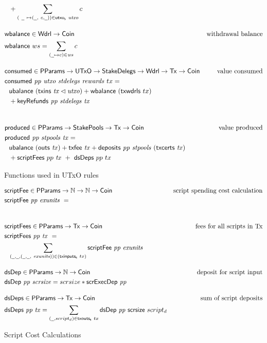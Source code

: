 \begin{figure}[htb]
\begin{align*}
    &~~ + \sum_{(~\wcard ~ \mapsto (\wcard, ~c,\wcard)) \in \fun{utxo_s}~\var{utxo}} c
    \nextdef
    & \fun{wbalance} \in \Wdrl \to \Coin
    & \text{withdrawal balance} \\
    & \fun{wbalance} ~ ws = \sum_{(\wcard\mapsto c)\in\var{ws}} c
    \nextdef
    & \fun{consumed} \in \PParams \to \UTxO \to \StakeDelegs \to \Wdrl \to \Tx \to \Coin
    & \text{value consumed} \\
    & \consumed{pp}{utxo}{stdelegs}{rewards}~{tx} = \\
    & ~~\ubalance{(\txins{tx} \restrictdom \var{utxo})} +
        \fun{wbalance}~(\fun{txwdrls}~{tx}) \\
    & ~~ + \keyRefunds{pp}{stdelegs}{tx} \\
    \nextdef
    & \fun{produced} \in \PParams \to \StakePools \to \Tx \to \Coin
    & \text{value produced} \\
    & \fun{produced}~\var{pp}~\var{stpools}~\var{tx} = \\
    &~~\ubalance{(\outs{tx})}
    + \txfee{tx} + \deposits{pp}{stpools}~{(\txcerts{tx})}\\
    &~~+ \fun{scriptFees}~{pp}~\var{tx}~+~ \fun{dsDeps}~{pp}~tx
  \end{align*}
  \caption{Functions used in UTxO rules}
  \label{fig:functions:utxo}
\end{figure}

\clearpage

\begin{figure}[htb]
  \begin{align*}
    & \fun{scriptFee} \in \PParams \to \N \to \N \to \Coin
    & \text{script spending cost calculation} \\
    & \fun{scriptFee} ~\var{pp}~ \var{exunits} ~=~ \\
    \nextdef
    & \fun{scriptFees} \in \PParams \to \Tx \to \Coin
    & \text{fees for all scripts in Tx} \\
    & \fun{scriptFees} ~\var{pp}~\var{tx}~=~\\
    &  ~~\sum_{(\wcard,\wcard,(\wcard,\wcard,~\var{exunits})) \in(\fun{txinputs_s} ~tx)}
      \fun{scriptFee} ~\var{pp}~ \var{exunits}
    \nextdef
    & \fun{dsDep} \in \PParams \to \N \to \Coin
    & \text{deposit for script input} \\
    & \fun{dsDep} ~\var{pp}~ \var{scrsize} = scrsize*\fun{scrExecDep}~\var{pp}
    \nextdef
    & \fun{dsDeps} \in \PParams \to \Tx \to \Coin
    & \text{sum of script deposits} \\
    & \fun{dsDeps} ~\var{pp}~ \var{tx} =
      \sum_{(\wcard,script_d)\in\fun{txouts_s} ~tx}
      \fun{dsDep} ~\var{pp}~ \fun{scrsize}~{script_d}
  \end{align*}
  \caption{Script Cost Calculations}
  \label{fig:functions:script}
\end{figure}


